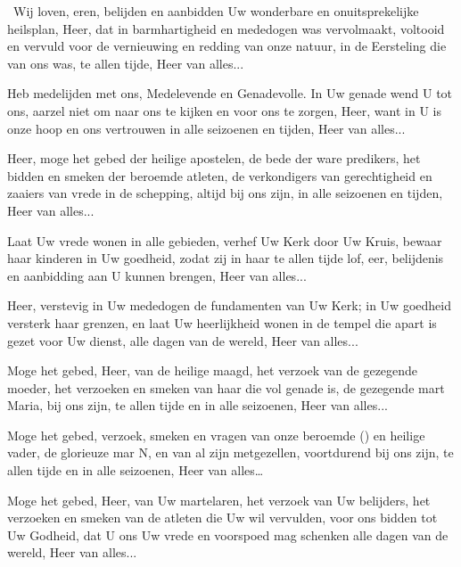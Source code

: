 \documentclass[12pt,twoside,a5paper]{article}
\begin{document}
\begin{halfparskip}
   

  \cc~Wij loven, eren, belijden en aanbidden Uw wonderbare en onuitsprekelijke heilsplan, Heer, dat in barmhartigheid en mededogen was vervolmaakt, voltooid en vervuld voor de vernieuwing en redding van onze natuur, in de Eersteling die van ons was, te allen tijde, Heer van alles...

   Heb medelijden met ons, Medelevende en Genadevolle. In Uw genade wend U tot ons, aarzel niet om naar ons te kijken en voor ons te zorgen, Heer, want in U is onze hoop en ons vertrouwen in alle seizoenen en tijden, Heer van alles...

   Heer, moge het gebed der heilige apostelen, de bede der ware predikers, het bidden en smeken der beroemde atleten, de verkondigers van gerechtigheid en zaaiers van vrede in de schepping, altijd bij ons zijn, in alle seizoenen en tijden, Heer van alles...

   Laat Uw vrede wonen in alle gebieden, verhef Uw Kerk door Uw Kruis, bewaar haar kinderen in Uw goedheid, zodat zij in haar te allen tijde lof, eer, belijdenis en aanbidding aan U kunnen brengen, Heer van alles...

   Heer, verstevig in Uw mededogen de fundamenten van Uw Kerk; in Uw goedheid versterk haar grenzen, en laat Uw heerlijkheid wonen in de tempel die apart is gezet voor Uw dienst, alle dagen van de wereld, Heer van alles...

   Moge het gebed, Heer, van de heilige maagd, het verzoek van de gezegende moeder, het verzoeken en smeken van haar die vol genade is, de gezegende mart Maria, bij ons zijn, te allen tijde en in alle seizoenen, Heer van alles...

   Moge het gebed, verzoek, smeken en vragen van onze beroemde () en heilige vader, de glorieuze mar N, en van al zijn metgezellen, voortdurend bij ons zijn, te allen tijde en in alle seizoenen, Heer van alles…

   Moge het gebed, Heer, van Uw martelaren, het verzoek van Uw belijders, het verzoeken en smeken van de atleten die Uw wil vervulden, voor ons bidden tot Uw Godheid, dat U ons Uw vrede en voorspoed mag schenken alle dagen van de wereld, Heer van alles...


\end{halfparskip}
\end{document}
